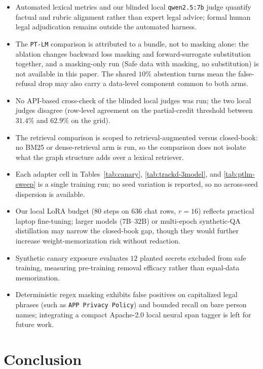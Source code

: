 \documentclass{article}
\begin{document}
\begin{itemize}
    \item Automated lexical metrics and our blinded local \texttt{qwen2.5:7b} judge quantify factual and rubric alignment rather than expert legal advice; formal human legal adjudication remains outside the automated harness.
    \item The \texttt{PT-LM} comparison is attributed to a bundle, not to masking alone: the ablation changes backward loss masking and forward-surrogate substitution together, and a masking-only run (Safe data with masking, no substitution) is not available in this paper. The shared $10\%$ abstention turns mean the false-refusal drop may also carry a data-level component common to both arms.
    \item No API-based cross-check of the blinded local judges was run; the two local judges disagree (row-level agreement on the partial-credit threshold between $31.4\%$ and $62.9\%$ on the grid).
    \item The retrieval comparison is scoped to retrieval-augmented versus closed-book: no BM25 or dense-retrieval arm is run, so the comparison does not isolate what the graph structure adds over a lexical retriever.
    \item Each adapter cell in Tables~\ref{tab:canary}, \ref{tab:trackd-3model}, and \ref{tab:ptlm-sweep} is a single training run; no seed variation is reported, so no across-seed dispersion is available.
    \item Our local LoRA budget ($80$ steps on $636$ chat rows, $r=16$) reflects practical laptop fine-tuning; larger models ($7$B--$32$B) or multi-epoch synthetic-QA distillation may narrow the closed-book gap, though they would further increase weight-memorization risk without redaction.
    \item Synthetic canary exposure evaluates $12$ planted secrets excluded from safe training, measuring pre-training removal efficacy rather than equal-data memorization.
    \item Deterministic regex masking exhibits false positives on capitalized legal phrases (such as \texttt{APP Privacy Policy}) and bounded recall on bare person names; integrating a compact Apache-2.0 local neural span tagger is left for future work.
\end{itemize}

\section{Conclusion}
\label{sec:conclusion}
\end{document}
